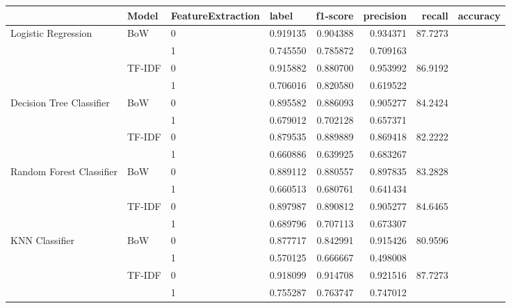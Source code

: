 \begin{tabular}{llllrrrl}
\toprule
{} &                       Model & FeatureExtraction & label &  f1-score &  precision &    recall & accuracy \\
\midrule
           Logistic Regression &               BoW &     0 &  0.919135 &   0.904388 &  0.934371 &  87.7273 \\
                               &                   &     1 &  0.745550 &   0.785872 &  0.709163 &          \\
                               &            TF-IDF &     0 &  0.915882 &   0.880700 &  0.953992 &  86.9192 \\
                               &                   &     1 &  0.706016 &   0.820580 &  0.619522 &          \\
      Decision Tree Classifier &               BoW &     0 &  0.895582 &   0.886093 &  0.905277 &  84.2424 \\
                               &                   &     1 &  0.679012 &   0.702128 &  0.657371 &          \\
                               &            TF-IDF &     0 &  0.879535 &   0.889889 &  0.869418 &  82.2222 \\
                               &                   &     1 &  0.660886 &   0.639925 &  0.683267 &          \\
      Random Forest Classifier &               BoW &     0 &  0.889112 &   0.880557 &  0.897835 &  83.2828 \\
                               &                   &     1 &  0.660513 &   0.680761 &  0.641434 &          \\
                             &            TF-IDF &     0 &  0.897987 &   0.890812 &  0.905277 &  84.6465 \\
                             &                   &     1 &  0.689796 &   0.707113 &  0.673307 &          \\
               KNN Classifier &               BoW &     0 &  0.877717 &   0.842991 &  0.915426 &  80.9596 \\
                              &                   &     1 &  0.570125 &   0.666667 &  0.498008 &          \\
                              &            TF-IDF &     0 &  0.918099 &   0.914708 &  0.921516 &  87.7273 \\
                              &                   &     1 &  0.755287 &   0.763747 &  0.747012 &          \\

\end{tabular}
